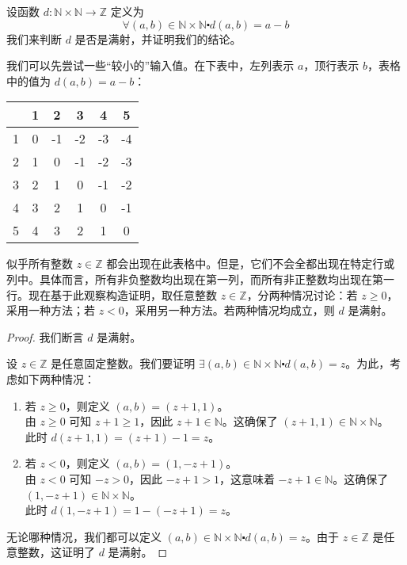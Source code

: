 \begin{example}
    设函数 $d : \mathbb{N} \times \mathbb{N} \to \mathbb{Z}$ 定义为
    \[\forall (a, b) \in \mathbb{N} \times \mathbb{N} \centerdot d(a, b) = a - b\]
    我们来判断 $d$ 是否是满射，并证明我们的结论。

    我们可以先尝试一些``较小的''输入值。在下表中，左列表示 $a$，顶行表示 $b$，表格中的值为 $d(a, b) = a - b$：
    \begin{center}
        \begin{tabular}{c|ccccc}
              & 1 & 2  & 3  & 4  & 5  \\
            \hline
            1 & 0 & -1 & -2 & -3 & -4 \\
            2 & 1 & 0  & -1 & -2 & -3 \\
            3 & 2 & 1  & 0  & -1 & -2 \\
            4 & 3 & 2  & 1  & 0  & -1 \\
            5 & 4 & 3  & 2  & 1  & 0  \\
        \end{tabular}
    \end{center}
    似乎所有整数 $z \in \mathbb{Z}$ 都会出现在此表格中。但是，它们不会全都出现在特定行或列中。具体而言，所有非负整数均出现在第一列，而所有非正整数均出现在第一行。现在基于此观察构造证明，取任意整数 $z \in \mathbb{Z}$，分两种情况讨论：若 $z \ge 0$，采用一种方法；若 $z < 0$，采用另一种方法。若两种情况均成立，则 $d$ 是满射。

    \begin{proof}
        我们断言 $d$ 是满射。

        设 $z \in \mathbb{Z}$ 是任意固定整数。我们要证明 $\exists (a, b) \in \mathbb{N} \times \mathbb{N} \centerdot d(a, b) = z$。为此，考虑如下两种情况：
        \begin{enumerate}[label=(\arabic*)]
            \item 若 $z \ge 0$，则定义 $(a, b) = (z + 1, 1)$。\\
                  由 $z \ge 0$ 可知 $z+1 \ge 1$，因此 $z+1 \in \mathbb{N}$。这确保了 $(z + 1, 1) \in \mathbb{N} \times \mathbb{N}$。\\
                  此时 $d(z + 1, 1) = (z + 1) - 1 = z$。
            \item 若 $z < 0$，则定义 $ (a, b) = (1, -z + 1)$。\\
                  由 $z < 0$ 可知 $-z > 0$，因此 $-z+1 > 1$，这意味着 $-z+1 \in \mathbb{N}$。这确保了 $(1, -z+1) \in \mathbb{N} \times \mathbb{N}$。\\
                  此时 $d(1, -z + 1) = 1 - (-z + 1) = z$。
        \end{enumerate}
        无论哪种情况，我们都可以定义 $(a, b) \in \mathbb{N} \times \mathbb{N} \centerdot d(a, b) = z$。由于 $z \in \mathbb{Z}$ 是任意整数，这证明了 $d$ 是满射。
    \end{proof}
\end{example}

